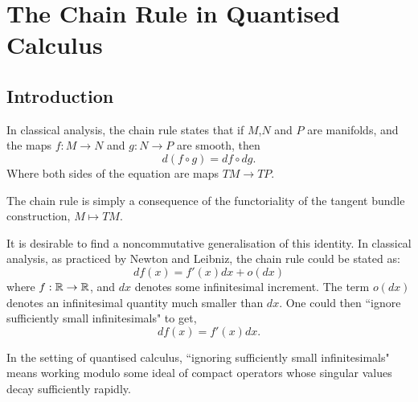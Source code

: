 
\chapter{The Chain Rule in Quantised Calculus} %

\label{TheChainRule} %



\section{Introduction}
In classical analysis, the chain rule states that if $M$,$N$ and $P$ are manifolds, 
 and the maps $f:M\rightarrow N$ and $g:N\rightarrow P$ are smooth, then
\begin{equation*}
    d(f\circ g) = df \circ dg.
\end{equation*}
Where both sides of the equation are maps $TM\rightarrow TP$.

\begin{remark}
    The chain rule is simply a consequence of the functoriality of the tangent
    bundle construction, $M\mapsto TM$.
\end{remark}

 It is desirable
to find a noncommutative generalisation of this identity. In classical analysis,
as practiced by Newton and Leibniz, the chain rule could be stated as:
\begin{equation}
\label{classicalChainRule}
    df(x) = f'(x)dx+o(dx)
\end{equation}
where $f:\mathbb{R}\to\mathbb{R}$, and $dx$ denotes some infinitesimal increment.
The term $o(dx)$ denotes an infinitesimal quantity much smaller than $dx$. 
One could then ``ignore sufficiently small infinitesimals" to get,
\begin{equation}
    df(x) = f'(x)dx.
\end{equation}  

In the setting of quantised calculus, ``ignoring sufficiently small infinitesimals"
means working modulo some ideal of compact operators whose singular values
decay sufficiently rapidly.


